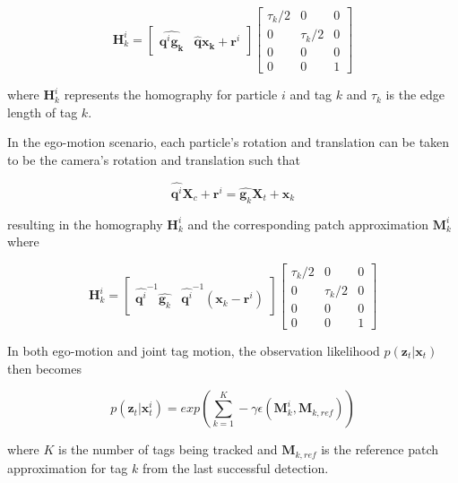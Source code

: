 \documentclass[letterpaper, 10 pt, conference]{ieeeconf}
\renewcommand{\vec}[1]{\boldsymbol{#1}}
\begin{document}
\begin{equation}
	\vec{H}^i_{k} =
	\begin{bmatrix}
		\widehat{\vec{q}^i \vec{g_k}} & \widehat{\vec{q}} \vec{x_k} + \vec{r}^i
	\end{bmatrix}\begin{bmatrix}
		\tau_k/2 & 0 & 0 \\
		0 & \tau_k/2 & 0 \\
		0 & 0 & 0 \\
		0 & 0 & 1
	\end{bmatrix}
\end{equation}

where $\vec{H}^i_k$ represents the homography for particle $i$ and tag $k$ and $\tau_k$ is the edge length of tag $k$.


In the ego-motion scenario, each particle's rotation and translation can be taken to be the camera's rotation and  translation such that

\begin{equation}
	\widehat{\vec{q}^i}\vec{X}_c + \vec{r}^i = \widehat{\vec{g}_k} \vec{X}_t + \vec{x}_k
\end{equation}

resulting in the homography $\vec{H}^i_k$ and the corresponding patch approximation $\vec{M}^i_k$ where

\begin{equation}
	\vec{H}^i_k = \begin{bmatrix}
		\widehat{\vec{q}^i}^{-1} \widehat{\vec{g}_k} & \widehat{\vec{q}^i}^{-1} (\vec{x}_k - \vec{r}^i)
	\end{bmatrix} \begin{bmatrix}
		\tau_k/2 & 0 & 0 \\
		0 & \tau_k/2 & 0 \\
		0 & 0 & 0 \\
		0 & 0 & 1
	\end{bmatrix}
\end{equation}


In both ego-motion and joint tag motion, the observation likelihood $p(\vec{z}_t|\vec{x}_{t})$ then becomes

\begin{equation}
	p(\vec{z}_t|\vec{x}^i_{t}) = exp(\sum^{K}_{k=1} -\gamma \epsilon(\vec{M}^i_k, \vec{M}_{k, ref}))
\end{equation}

where $K$ is the number of tags being tracked and $\vec{M}_{k,ref}$ is the reference patch approximation for tag $k$ from the last successful detection.
\end{document}
